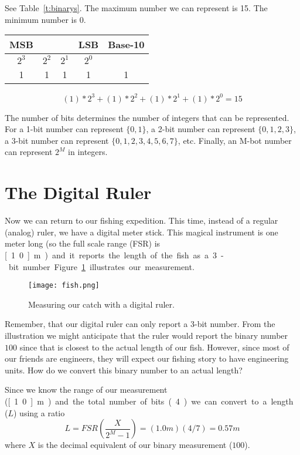 \begin{soln}
See Table~\ref{t:binarys}.  The maximum number we can represent is 15.  The minimum number is 0.
\begin{table*}[bt!] 
\renewcommand{\arraystretch}{1.2}
\caption{Solution}
\label{t:binarys}
\centering
\begin{tabular}{|c|c|c|c||c|}\hline
MSB &\hspace{4ex} & \hspace{4ex}& LSB & Base-10\\ \hline \hline
$2^3$ & $2^2$ & $2^1$ & $2^0$ & \\ \hline \hline
1 & 1 & 1 & 1 & 1 \\ \hline
\end{tabular}
\end{table*}
\[ (1)*2^3+(1)*2^2+(1)*2^1+(1)*2^0 = 15 \]

\end{soln}

\fi


The number of bits determines the number of integers that can be represented.  For a 1-bit number can represent $\{0,1\}$, a 2-bit number can represent $\{0,1,2,3\}$, a 3-bit number can represent $\{0,1,2,3,4,5,6,7\}$, etc.  Finally, an M-bot number can represent $2^M$ in integers.  

\section{The Digital Ruler}
Now we can return to our fishing expedition.  This time, instead of a regular (analog) ruler, we have a digital meter stick.  This magical instrument is one meter long (so the full scale range (FSR) is \unit[1.0]{m}) and it reports the length of the fish as a 3-bit number.  Figure~\ref{f:fish} illustrates our measurement.
\begin{figure}[hbt!]
\centering
\texttt{[image: fish.png]}
\caption{Measuring our catch with a digital ruler.}
\label{f:fish}
\end{figure}

Remember, that our digital ruler can only report a 3-bit number.  From the illustration we might anticipate that the ruler would report the binary number $100$ since that is closest to the actual length of our fish.  However, since most of our friends are engineers, they will expect our fishing story to have engineering units.  How do we convert this binary number to an actual length?

Since we know the range of our measurement (\unit[1.0]{m}) and the total number of bits (4) we can convert to a length ($L$) using a ratio
\begin{equation}
L = FSR \left(\frac{X}{2^M - 1}\right
) = (1.0 m)(4/7) = 0.57 m
\end{equation}
where $X$ is the decimal equivalent of our binary measurement ($100$).  

